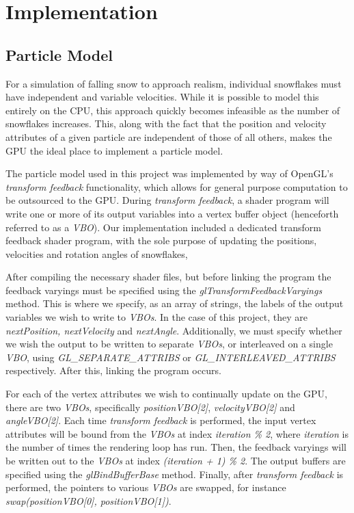 \documentclass[conference]{acmsiggraph}
\begin{document}
\section{Implementation}

\subsection{Particle Model}
For a simulation of falling snow to approach realism, individual snowflakes must have independent and variable velocities. While it is possible to model this entirely on the CPU, this approach quickly becomes infeasible as the number of snowflakes increases. This, along with the fact that the position and velocity attributes of a given particle are independent of those of all others, makes the GPU the ideal place to implement a particle model.

The particle model used in this project was implemented by way of OpenGL's \textit{transform feedback} functionality, which allows for general purpose computation to be outsourced to the GPU. During \textit{transform feedback}, a shader program will write one or more of its output variables into a vertex buffer object (henceforth referred to as a \textit{VBO}). Our implementation included a dedicated transform feedback shader program, with the sole purpose of updating the positions, velocities and rotation angles of snowflakes, 

After compiling the necessary shader files, but before linking the program the feedback varyings must be specified using the \textit{glTransformFeedbackVaryings} method. This is where we specify, as an array of strings, the labels of the output variables we wish to write to \textit{VBOs}. In the case of this project, they are \textit{nextPosition, nextVelocity} and \textit{nextAngle}. Additionally, we must specify whether we wish the output to be written to separate \textit{VBOs}, or interleaved on a single \textit{VBO}, using \textit{GL\_SEPARATE\_ATTRIBS} or \textit{GL\_INTERLEAVED\_ATTRIBS} respectively. After this, linking the program occurs.

For each of the vertex attributes we wish to continually update on the GPU, there are two \textit{VBOs}, specifically \textit{positionVBO[2]}, \textit{velocityVBO[2]} and \textit{angleVBO[2]}. Each time \textit{transform feedback} is performed, the input vertex attributes will be bound from the \textit{VBOs} at index \textit{iteration \% 2}, where \textit{iteration} is the number of times the rendering loop has run. Then, the feedback varyings will be written out to the \textit{VBOs} at index \textit{(iteration + 1) \% 2}. The output buffers are specified using the \textit{glBindBufferBase} method. Finally, after \textit{transform feedback} is performed, the pointers to various \textit{VBOs} are swapped, for instance \textit{swap(positionVBO[0], positionVBO[1])}.
\end{document}
